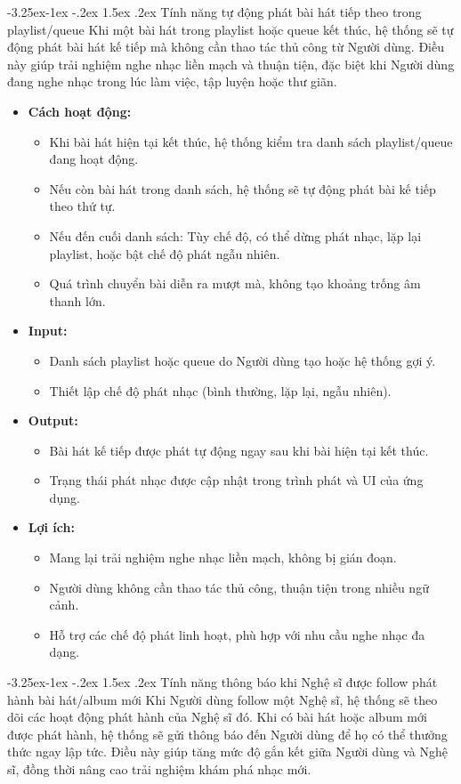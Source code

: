 \documentclass[a4paper]{article}
\makeatletter
\newcommand{\cach}{\hspace*{1.5em}\ignorespaces}
\newcounter {subsubsubsection}[subsubsection]
\newcommand\subsubsubsection{\@startsection{subsubsubsection}{4}{\z@}%
                                     {-3.25ex\@plus -1ex \@minus -.2ex}%
                                     {1.5ex \@plus .2ex}%
                                     {\normalfont\normalsize\bfseries}}
\makeatother
\begin{document}
\subsubsubsection{Tính năng tự động phát bài hát tiếp theo trong playlist/queue}  
\cach Khi một bài hát trong playlist hoặc queue kết thúc, hệ thống sẽ tự động phát bài hát kế tiếp mà không cần thao tác thủ công từ Người dùng.  
Điều này giúp trải nghiệm nghe nhạc liền mạch và thuận tiện, đặc biệt khi Người dùng đang nghe nhạc trong lúc làm việc, tập luyện hoặc thư giãn.  

\begin{itemize}
    \item \textbf{Cách hoạt động:}
    \begin{itemize}
        \item Khi bài hát hiện tại kết thúc, hệ thống kiểm tra danh sách playlist/queue đang hoạt động.
        \item Nếu còn bài hát trong danh sách, hệ thống sẽ tự động phát bài kế tiếp theo thứ tự.
        \item Nếu đến cuối danh sách: Tùy chế độ, có thể dừng phát nhạc, lặp lại playlist, hoặc bật chế độ phát ngẫu nhiên.
        \item Quá trình chuyển bài diễn ra mượt mà, không tạo khoảng trống âm thanh lớn.
    \end{itemize}

    \item \textbf{Input:}
    \begin{itemize}
        \item Danh sách playlist hoặc queue do Người dùng tạo hoặc hệ thống gợi ý.
        \item Thiết lập chế độ phát nhạc (bình thường, lặp lại, ngẫu nhiên).
    \end{itemize}

    \item \textbf{Output:}
    \begin{itemize}
        \item Bài hát kế tiếp được phát tự động ngay sau khi bài hiện tại kết thúc.
        \item Trạng thái phát nhạc được cập nhật trong trình phát và UI của ứng dụng.
    \end{itemize}


    \item \textbf{Lợi ích:}
    \begin{itemize}
        \item Mang lại trải nghiệm nghe nhạc liền mạch, không bị gián đoạn.
        \item Người dùng không cần thao tác thủ công, thuận tiện trong nhiều ngữ cảnh.
        \item Hỗ trợ các chế độ phát linh hoạt, phù hợp với nhu cầu nghe nhạc đa dạng.
    \end{itemize}
\end{itemize}
\subsubsubsection{Tính năng thông báo khi Nghệ sĩ được follow phát hành bài hát/album mới}  
\cach Khi Người dùng follow một Nghệ sĩ, hệ thống sẽ theo dõi các hoạt động phát hành của Nghệ sĩ đó.  
Khi có bài hát hoặc album mới được phát hành, hệ thống sẽ gửi thông báo đến Người dùng để họ có thể thưởng thức ngay lập tức.  
Điều này giúp tăng mức độ gắn kết giữa Người dùng và Nghệ sĩ, đồng thời nâng cao trải nghiệm khám phá nhạc mới.  
\end{document}
